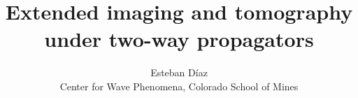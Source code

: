 

\newcommand*{\mytext}[2]{%
\noindent\color{#1!80}{%
\parbox{0.98\linewidth}{#2}}}%


\author{\textup{Esteban D\'{i}az}\\
Center for Wave Phenomena,  
Colorado School of Mines}

\title{Extended imaging and tomography under two-way propagators}

\maketitle


\newif\ifreport
\reporttrue

















